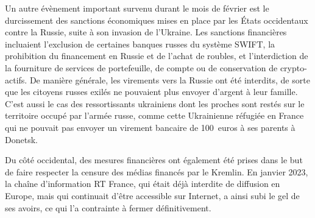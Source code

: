 Un autre évènement important survenu durant le mois de février est le durcissement des sanctions économiques mises en place par les États occidentaux contre la Russie, suite à son invasion de l'Ukraine. Les sanctions financières incluaient l'exclusion de certaines banques russes du système SWIFT, la prohibition du financement en Russie et de l'achat de roubles, et l'interdiction de la fourniture de services de portefeuille, de compte ou de conservation de crypto-actifs. De manière générale, les virements vers la Russie ont été interdits, de sorte que les citoyens russes exilés ne pouvaient plus envoyer d'argent à leur famille. C'est aussi le cas des ressortissants ukrainiens dont les proches sont restés sur le territoire occupé par l'armée russe, comme cette Ukrainienne réfugiée en France qui ne pouvait pas envoyer un virement bancaire de 100~euros à ses parents à Donetsk. %

Du côté occidental, des mesures financières ont également été prises dans le but de faire respecter la censure des médias financés par le Kremlin. En janvier 2023, la chaîne d'information RT France, qui était déjà interdite de diffusion en Europe, mais qui continuait d'être accessible sur Internet, a ainsi subi le gel de ses avoirs, ce qui l'a contrainte à fermer définitivement.

